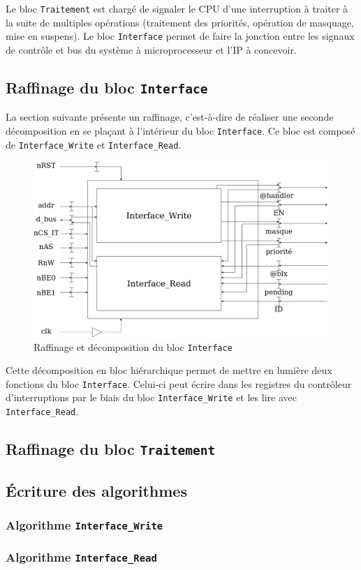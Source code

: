Le bloc \texttt{Traitement} est chargé de signaler le CPU d'une interruption à traiter à la suite de multiples opérations (traitement des priorités, opération de masquage, mise en suspens). Le bloc \texttt{Interface} permet de faire la jonction entre les signaux de contrôle et bus du système à microprocesseur et l'IP à concevoir. 

\newpage

\subsection{Raffinage du bloc \texttt{Interface}}

La section suivante présente un raffinage, c'est-à-dire de réaliser une seconde décomposition en se plaçant à l'intérieur du bloc \texttt{Interface}. Ce bloc est composé de \texttt{Interface\_Write} et \texttt{Interface\_Read}. 

\begin{figure}[H]
	\centering
	\includegraphics[width=0.9\linewidth]{figure/raffinage_interface.png}
	\caption{Raffinage et décomposition du bloc \texttt{Interface}}
	\label{fig:raffinage_interface}
\end{figure}

Cette décomposition en bloc hiérarchique permet de mettre en lumière deux fonctions du bloc \texttt{Interface}. Celui-ci peut écrire dans les registres du contrôleur d'interruptions par le biais du bloc \texttt{Interface\_Write} et les lire avec \texttt{Interface\_Read}.

\subsection{Raffinage du bloc \texttt{Traitement}}

\newpage

\subsection{Écriture des algorithmes}

\subsubsection{Algorithme \texttt{Interface\_Write}}

\subsubsection{Algorithme \texttt{Interface\_Read}}